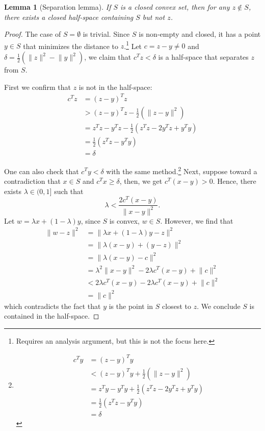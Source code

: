 \documentclass{tufte-handout}
\newtheorem{lem}[thm]{Lemma}
\theoremstyle{definition}
\theoremstyle{remark}
\newcommand{\norm}[1]{\lVert #1 \rVert}
\begin{document}
\begin{lem}[Separation lemma]
	If $S$ is a closed convex set, then for any $z \notin S$, there exists a closed half-space containing $S$ but not $z$.
\end{lem}
\begin{proof}
	The case of $S = \emptyset$ is trivial. Since $S$ is non-empty and closed, it has a point $y\in S$ that minimizes the distance to $z$.\footnote{Requires an  analysis argument, but this is not the focus here.} Let $c = z-y \neq 0$ and $\delta = \frac{1}{2}(\norm{z}^2 - \norm{y}^2)$, we claim that $c^Tz < \delta$ is a half-space that separates $z$ from $S$.
	
	First we confirm that $z$ is not in the half-space:
	\begin{align*}
		c^Tz &= (z-y)^Tz\\
		&> (z-y)^Tz - \frac{1}{2}(\norm{z-y}^2)\\
		&= z^Tz - y^Tz - \frac{1}{2}(z^Tz - 2y^Tz + y^Ty)\\
		&= \frac{1}{2}(z^Tz - y^Ty)\\
		&= \delta
	\end{align*}
	
	One can also check that $c^Ty < \delta$ with the same method.\footnote{\begin{align*}
			c^Ty &= (z-y)^Ty\\
			&< (z-y)^Ty + \frac{1}{2}(\norm{z-y}^2)\\
			&= z^Ty - y^Ty + \frac{1}{2}(z^Tz - 2y^Tz + y^Ty)\\
			&= \frac{1}{2}(z^Tz - y^Ty)\\
			&= \delta
	\end{align*}}
	Next, suppose toward a contradiction that $x \in S$ and $c^Tx \geq \delta$, then, we get $c^T(x-y) > 0$. Hence, there exists $\lambda \in (0,1]$ such that
	$$\lambda < \frac{2c^T(x-y)}{\norm{x-y}^2}.$$
	Let $w = \lambda x + (1-\lambda)y$, since $S$ is convex, $w \in S$. However, we find that 
	\begin{align*}
		\norm{w-z}^2 &= \norm{\lambda x + (1-\lambda)y - z}^2\\
		&= \norm{\lambda (x-y) + (y-z)}^2\\
		&= \norm{\lambda(x-y) - c}^2\\
		&= \lambda^2\norm{x-y}^2 - 2\lambda c^T(x-y) + \norm{c}^2\\
		&<  2\lambda c^T(x-y) -  2\lambda c^T(x-y) + \norm{c}^2\\
		&= \norm{c}^2
	\end{align*}
	which contradicts the fact that $y$ is the point in $S$ closest to $z$. We conclude $S$ is contained in the half-space.
\end{proof}
\end{document}
